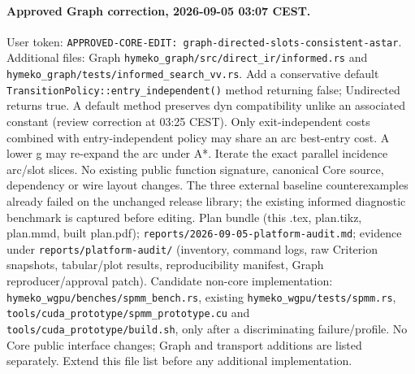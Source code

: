 \documentclass[10pt,a4paper]{article}
\begin{document}
\paragraph{Approved Graph correction, 2026-09-05 03:07 CEST.}
User token: \texttt{APPROVED-CORE-EDIT: graph-directed-slots-consistent-astar}.
Additional files: Graph \texttt{hymeko\_graph/src/direct\_ir/informed.rs} and
\texttt{hymeko\_graph/tests/informed\_search\_vv.rs}.
Add a conservative default \texttt{TransitionPolicy::entry\_independent()} method
returning false; Undirected returns true. A default method preserves dyn compatibility
unlike an associated constant (review correction at 03:25 CEST). Only exit-independent costs combined with
entry-independent policy may share an arc best-entry cost. A lower g may re-expand
the arc under A*. Iterate the exact parallel incidence arc/slot slices. No existing
public function signature, canonical Core source, dependency or wire layout changes.
The three external baseline counterexamples already failed on the unchanged release
library; the existing informed diagnostic benchmark is captured before editing.
Plan bundle (this .tex, plan.tikz, plan.mmd, built plan.pdf); \texttt{reports/2026-09-05-platform-audit.md}; evidence under \texttt{reports/platform-audit/} (inventory, command logs, raw Criterion snapshots, tabular/plot results, reproducibility manifest, Graph reproducer/approval patch). Candidate non-core implementation: \texttt{hymeko\_wgpu/benches/spmm\_bench.rs}, existing \texttt{hymeko\_wgpu/tests/spmm.rs}, \texttt{tools/cuda\_prototype/spmm\_prototype.cu} and \texttt{tools/cuda\_prototype/build.sh}, only after a discriminating failure/profile. No Core public interface changes; Graph and transport additions are listed separately. Extend this file list before any additional implementation.
\end{document}
